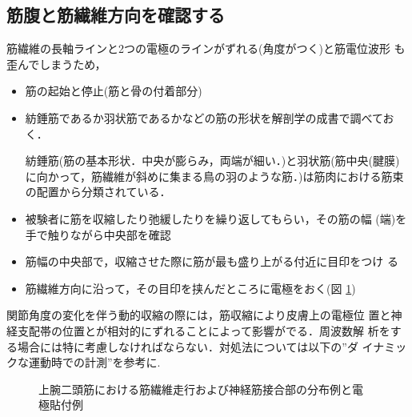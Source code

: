 \documentclass[10pt,twocolumn]{jarticle}
\begin{document}
\subsection{筋腹と筋繊維方向を確認する}
筋繊維の長軸ラインと2つの電極のラインがずれる(角度がつく)と筋電位波形
も歪んでしまうため，
\begin{itemize}
\item 筋の起始と停止(筋と骨の付着部分)
\item 紡錘筋であるか羽状筋であるかなどの筋の形状を解剖学の成書で調べておく．

紡錘筋(筋の基本形状．中央が膨らみ，両端が細い．)と羽状筋(筋中央(腱膜)
に向かって，筋繊維が斜めに集まる鳥の羽のような筋．)は筋肉における筋束の配置から分類されている．

\item 被験者に筋を収縮したり弛緩したりを繰り返してもらい，その筋の幅
  (端)を手で触りながら中央部を確認
\item 筋幅の中央部で，収縮させた際に筋が最も盛り上がる付近に目印をつけ
  る
\item 筋繊維方向に沿って，その目印を挟んだところに電極をおく(図
  \ref{fig:2-11})
\end{itemize}

関節角度の変化を伴う動的収縮の際には，筋収縮により皮膚上の電極位
置と神経支配帯の位置とが相対的にずれることによって影響がでる．周波数解
析をする場合には特に考慮しなければならない．対処法については以下の''ダ
イナミックな運動時での計測''を参考に. 

\begin{figure}[h]
  \centering
  \caption{上腕二頭筋における筋繊維走行および神経筋接合部の分布例と電
    極貼付例\label{fig:2-11}}
 \end{figure}
\end{document}

